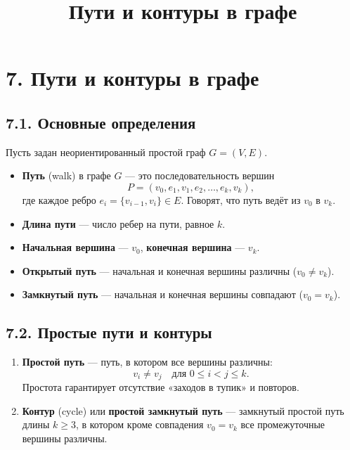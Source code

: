 \documentclass{article}
\begin{document}
\title{Пути и контуры в графе}
\author{}
\date{}
\makeatletter
\renewcommand{\maketitle}{
  \begin{center}
    {\Large\mdseries\@title\par}
    \vspace{0.5em}
  \end{center}
}
\makeatother
\maketitle

\section*{7. Пути и контуры в графе}

\subsection*{7.1. Основные определения}

Пусть задан неориентированный простой граф $G=(V,E)$.

\begin{itemize}[leftmargin=*]
  \item \textbf{Путь} (walk) в графе $G$ — это последовательность вершин
  \[
    P = (v_0, e_1, v_1, e_2, \dots, e_k, v_k),
  \]
  где каждое ребро $e_i = \{v_{i-1},v_i\}\in E$. Говорят, что путь ведёт из $v_0$ в $v_k$.
  \item \textbf{Длина пути} — число ребер на пути, равное $k$.
  \item \textbf{Начальная вершина} — $v_0$, \textbf{конечная вершина} — $v_k$.
  \item \textbf{Открытый путь} — начальная и конечная вершины различны ($v_0 \neq v_k$).
  \item \textbf{Замкнутый путь} — начальная и конечная вершины совпадают ($v_0 = v_k$).
\end{itemize}

\subsection*{7.2. Простые пути и контуры}

\begin{enumerate}[label=\arabic*)]
  \item \textbf{Простой путь} — путь, в котором все вершины различны:
  \[
    v_i \neq v_j \quad\text{для }0\le i<j\le k.
  \]
  Простота гарантирует отсутствие «заходов в тупик» и повторов.
  \item \textbf{Контур} (cycle) или \textbf{простой замкнутый путь} — замкнутый простой путь длины $k\ge3$, в котором кроме совпадения $v_0=v_k$ все промежуточные вершины различны.
\end{enumerate}
\end{document}
